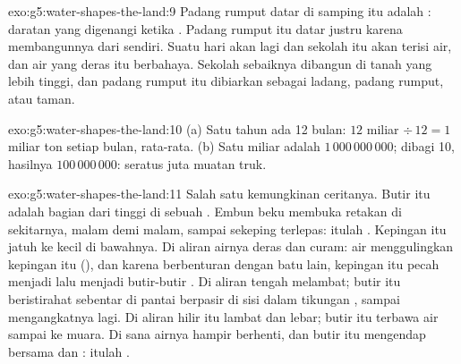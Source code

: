 \begin{solution}{exo:g5:water-shapes-the-land:9}
Padang rumput datar di samping  itu adalah : daratan
yang digenangi  ketika . Padang rumput itu datar justru karena
 membangunnya dari  sendiri. Suatu hari  akan 
lagi dan sekolah itu akan terisi air, dan air  yang deras itu
berbahaya. Sekolah sebaiknya dibangun di tanah yang lebih tinggi, dan
padang rumput itu dibiarkan sebagai ladang, padang rumput, atau taman.
\end{solution}

\begin{solution}{exo:g5:water-shapes-the-land:10}
(a) Satu tahun ada 12 bulan: $12$ miliar $\div\, 12 = 1$ miliar ton setiap
bulan, rata-rata. (b) Satu miliar adalah $1\,000\,000\,000$; dibagi 10,
hasilnya $100\,000\,000$: seratus juta muatan truk.
\end{solution}

\begin{solution}{exo:g5:water-shapes-the-land:11}
Salah satu kemungkinan ceritanya. Butir itu adalah bagian dari 
tinggi di sebuah . Embun beku membuka retakan di sekitarnya, malam
demi malam, sampai sekeping  terlepas: itulah . Kepingan itu
jatuh ke  kecil di bawahnya. Di aliran  airnya deras dan curam:
air menggulingkan kepingan itu (), dan karena berbenturan dengan batu
lain, kepingan itu pecah menjadi  lalu menjadi butir-butir . Di
aliran tengah  melambat; butir itu beristirahat sebentar di pantai
berpasir di sisi dalam tikungan , sampai  mengangkatnya lagi.
Di aliran hilir  itu lambat dan lebar; butir itu terbawa air sampai ke
muara. Di sana airnya hampir berhenti, dan butir itu mengendap bersama
 dan  : itulah .
\end{solution}
